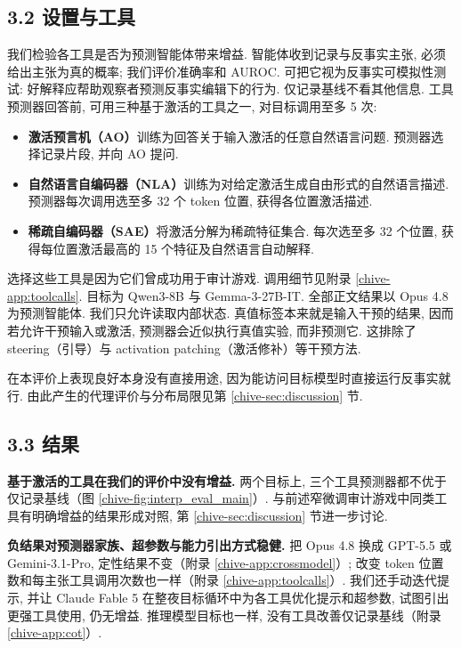 \subsection*{3.2 设置与工具}
我们检验各工具是否为预测智能体带来增益. 智能体收到记录与反事实主张, 必须给出主张为真的概率; 我们评价准确率和 AUROC. 可把它视为反事实可模拟性测试\cite{chive-chen2023modelsexplainthemselvescounterfactual}: 好解释应帮助观察者预测反事实编辑下的行为. 仅记录基线不看其他信息. 工具预测器回答前, 可用三种基于激活的工具之一, 对目标调用至多 5 次:
\begin{itemize}
\item \textbf{激活预言机（AO）}训练为回答关于输入激活的任意自然语言问题\cite{chive-karvonen2026activationoraclestrainingevaluating}. 预测器选择记录片段, 并向 AO 提问.
\item \textbf{自然语言自编码器（NLA）}训练为对给定激活生成自由形式的自然语言描述\cite{chive-frasertaliente2026nla}. 预测器每次调用选至多 32 个 token 位置, 获得各位置激活描述.
\item \textbf{稀疏自编码器（SAE）}将激活分解为稀疏特征集合\cite{chive-cunningham2023sparseautoencodershighlyinterpretable,chive-bricken2023monosemanticity}. 每次选至多 32 个位置, 获得每位置激活最高的 15 个特征及自然语言自动解释.
\end{itemize}
选择这些工具是因为它们曾成功用于审计游戏. 调用细节见附录 \ref{chive-app:toolcalls}. 目标为 Qwen3-8B 与 Gemma-3-27B-IT. 全部正文结果以 Opus 4.8 为预测智能体. 我们只允许读取内部状态. 真值标签本来就是输入干预的结果, 因而若允许干预输入或激活, 预测器会近似执行真值实验, 而非预测它. 这排除了 steering（引导）与 activation patching（激活修补）等干预方法.

在本评价上表现良好本身没有直接用途, 因为能访问目标模型时直接运行反事实就行. 由此产生的代理评价与分布局限见第 \ref{chive-sec:discussion} 节.

\subsection*{3.3 结果}
\textbf{基于激活的工具在我们的评价中没有增益.} 两个目标上, 三个工具预测器都不优于仅记录基线（图 \ref{chive-fig:interp_eval_main}）. 与前述窄微调审计游戏中同类工具有明确增益的结果形成对照, 第 \ref{chive-sec:discussion} 节进一步讨论.

\textbf{负结果对预测器家族、超参数与能力引出方式稳健.} 把 Opus 4.8 换成 GPT-5.5 或 Gemini-3.1-Pro, 定性结果不变（附录 \ref{chive-app:crossmodel}）; 改变 token 位置数和每主张工具调用次数也一样（附录 \ref{chive-app:toolcalls}）. 我们还手动迭代提示, 并让 Claude Fable 5 在整夜目标循环中为各工具优化提示和超参数, 试图引出更强工具使用, 仍无增益. 推理模型目标也一样, 没有工具改善仅记录基线（附录 \ref{chive-app:cot}）.

